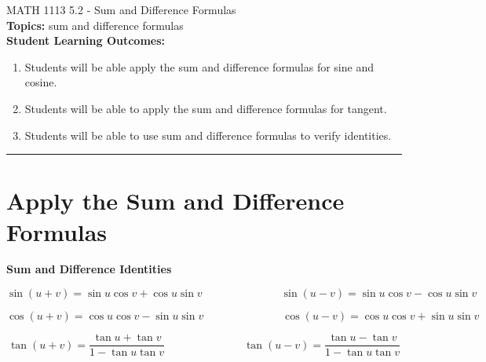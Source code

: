 \documentclass[11pt]{article}
\newcommand{\boxcolor}{gray!30}
\newenvironment{boxthm}{\begin{mdframed}[backgroundcolor=\boxcolor,nobreak=true]}{\end{mdframed}}
\begin{document}
\noindent MATH 1113   \hfill 5.2 - Sum and Difference Formulas\\



\noindent \textbf{Topics:}  sum and difference formulas\\

\noindent \textbf{Student Learning Outcomes:}
\begin{enumerate}
\item Students will be able apply the sum and difference formulas for sine and cosine.
\item Students will be able to apply the sum and difference formulas for tangent.
\item Students will be able to use sum and difference formulas to verify identities.

\end{enumerate}

\hrule 
\vspace{5mm}

\section{Apply the Sum and Difference Formulas}

\begin{boxthm}
{\bf Sum and Difference Identities}

$$\sin(u+v) = \sin u \cos v + \cos u \sin v \hspace{3cm}\sin(u-v) = \sin u \cos v - \cos u \sin v$$

$$\cos(u+v) = \cos u \cos v - \sin u \sin v \hspace{3cm}\cos(u-v) = \cos u \cos v + \sin u \sin v$$

$$\tan(u+v) = \frac{\tan u +\tan v}{1-\tan u \tan v} \hspace{3cm}\tan(u-v) =  \frac{\tan u -\tan v}{1-\tan u \tan v}$$

\end{boxthm}
\end{document}
